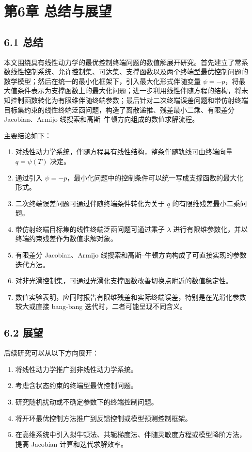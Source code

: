 \documentclass[UTF8,a4paper,zihao=-4]{ctexart}
\begin{document}
\section{第6章 总结与展望}

\subsection{6.1 总结}

本文围绕具有线性动力学的最优控制终端问题的数值解展开研究。首先建立了常系数线性控制系统、允许控制集、可达集、支撑函数以及两个终端型最优控制问题的数学模型；然后在统一的最小化框架下，引入最大化形式伴随变量 $\psi=-p$，将最大值条件表示为支撑函数上的最大化问题；进一步利用线性伴随方程的结构，将未知控制函数转化为有限维伴随终端参数；最后针对二次终端误差问题和带仿射终端目标集约束的线性终端泛函问题，构造了离散递推、残差最小二乘、有限差分 Jacobian、Armijo 线搜索和高斯--牛顿方向组成的数值求解流程。

主要结论如下：

\begin{enumerate}
\item 对线性动力学系统，伴随方程具有线性结构，整条伴随轨线可由终端向量 $q=\psi(T)$ 决定。
\item 通过引入 $\psi=-p$，最小化问题中的控制条件可以统一写成支撑函数的最大化形式。
\item 二次终端误差问题可通过伴随终端条件转化为关于 $q$ 的有限维残差最小二乘问题。
\item 带仿射终端目标集的线性终端泛函问题可通过乘子 $\lambda$ 进行有限维参数化，并以终端约束残差作为数值求解对象。
\item 有限差分 Jacobian、Armijo 线搜索和高斯--牛顿方向构成了可直接实现的参数迭代方法。
\item 对非光滑控制集，可通过光滑化支撑函数改善切换点附近的数值稳定性。
\item 数值实验表明，应同时报告有限维残差和实际终端误差，特别是在光滑化参数较大或直接 bang-bang 迭代时，二者可能呈现不同含义。
\end{enumerate}

\subsection{6.2 展望}

后续研究可以从以下方向展开：

\begin{enumerate}
\item 将线性动力学推广到非线性动力学系统。
\item 考虑含状态约束的终端型最优控制问题。
\item 研究随机扰动或不确定参数下的终端控制问题。
\item 将开环最优控制方法推广到反馈控制或模型预测控制框架。
\item 在高维系统中引入拟牛顿法、共轭梯度法、伴随灵敏度方程或模型降阶方法，提高 Jacobian 计算和迭代求解效率。
\end{enumerate}
\end{document}
